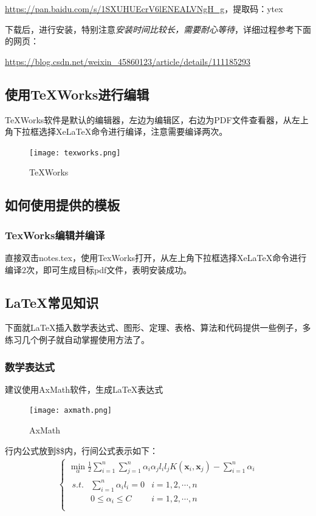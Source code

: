 \documentclass[cs4size,a4paper]{ctexart}
\numberwithin{equation}{section}
\numberwithin{table}{section}
\numberwithin{figure}{section}
\begin{document}
\url{https://pan.baidu.com/s/1SXUHUEcrV6lENEALVNgH_g}，提取码：ytex

下载后，进行安装，特别注意\emph{安装时间比较长，需要耐心等待}，详细过程参考下面的网页：

\url{https://blog.csdn.net/weixin_45860123/article/details/111185293}

\subsection{使用TeXWorks进行编辑}
TeXWorks软件是默认的编辑器，左边为编辑区，右边为PDF文件查看器，从左上角下拉框选择XeLaTeX命令进行编译，注意需要编译两次。

\begin{figure}[H]
\small
\centering
\texttt{[image: texworks.png]}
\caption{TeXWorks} \label{fig:texworks}
\end{figure}

\subsection{如何使用提供的模板}
\subsubsection{TexWorks编辑并编译}
直接双击notes.tex，使用TexWorks打开，从左上角下拉框选择XeLaTeX命令进行编译$2$次，即可生成目标pdf文件，表明安装成功。

\subsection{LaTeX常见知识}
下面就LaTeX插入数学表达式、图形、定理、表格、算法和代码提供一些例子，多练习几个例子就自动掌握使用方法了。

\subsubsection{数学表达式}
建议使用AxMath软件，生成LaTeX表达式
\begin{figure}[H]
\small
\centering
\texttt{[image: axmath.png]}
\caption{AxMath} \label{fig:axmath}
\end{figure}

行内公式放到\$\$内，行间公式表示如下：
\begin{align}
\begin{cases}
	\min_{\alpha} \frac{1}{2}\sum_{i=1}^n\sum_{j=1}^n\alpha_i\alpha_jl_il_jK(\bm{x}_i,\bm{x}_j) -\sum_{i=1}^n \alpha_i\\
	\begin{matrix}
	s.t.&	\sum_{i=1}^n\alpha_il_i = 0	& i=1,2,\cdots ,n \\
       &	0\leq \alpha_i\leq C	& i=1,2,\cdots ,n	 \\
\end{matrix}
\end{cases}
\end{align}
\end{document}
